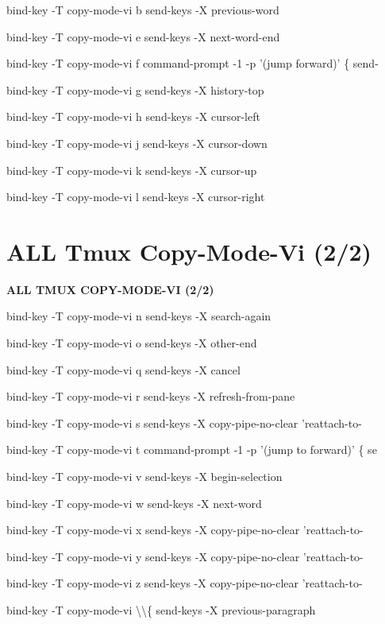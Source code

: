 \documentclass[11pt,a4paper,twoside]{book}
\begin{document}
bind-key  -T copy-mode-vi b  send-keys -X previous-word

bind-key  -T copy-mode-vi e  send-keys -X next-word-end

bind-key  -T copy-mode-vi f  command-prompt -1 -p '(jump forward)' \{ send-

bind-key  -T copy-mode-vi g  send-keys -X history-top

bind-key  -T copy-mode-vi h  send-keys -X cursor-left

bind-key  -T copy-mode-vi j  send-keys -X cursor-down

bind-key  -T copy-mode-vi k  send-keys -X cursor-up

bind-key  -T copy-mode-vi l  send-keys -X cursor-right


\vspace{16pt}

\section{ALL Tmux Copy-Mode-Vi (2/2)}


\vspace{10pt}
{\large\bfseries\color{neoncyan} ALL TMUX COPY-MODE-VI (2/2)}\vspace{6pt}

bind-key  -T copy-mode-vi n  send-keys -X search-again

bind-key  -T copy-mode-vi o  send-keys -X other-end

bind-key  -T copy-mode-vi q  send-keys -X cancel

bind-key  -T copy-mode-vi r  send-keys -X refresh-from-pane

bind-key  -T copy-mode-vi s  send-keys -X copy-pipe-no-clear 'reattach-to-

bind-key  -T copy-mode-vi t  command-prompt -1 -p '(jump to forward)' \{ se

bind-key  -T copy-mode-vi v  send-keys -X begin-selection

bind-key  -T copy-mode-vi w  send-keys -X next-word

bind-key  -T copy-mode-vi x  send-keys -X copy-pipe-no-clear 'reattach-to-

bind-key  -T copy-mode-vi y  send-keys -X copy-pipe-no-clear 'reattach-to-

bind-key  -T copy-mode-vi z  send-keys -X copy-pipe-no-clear 'reattach-to-

bind-key  -T copy-mode-vi \textbackslash{}\textbackslash{}\{  send-keys -X previous-paragraph
\end{document}
